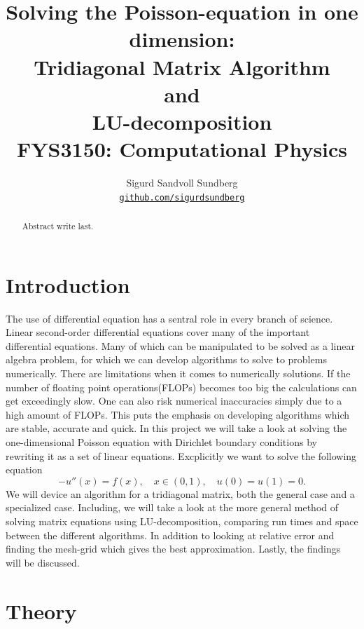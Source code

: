 \documentclass[10pt, a4paper]{amsart}
\title[Solving the Poisson-equation in one dimension]{Solving the Poisson-equation in one dimension: \\
\normalsize{Tridiagonal Matrix Algorithm\\
 and \\
 LU-decomposition} \\
  \hrulefill\small{ FYS3150: Computational Physics }\hrulefill}
\author[Sundberg]{Sigurd Sandvoll Sundberg \\
  \href{https://github.com/SigurdSundberg/FYS3150/tree/master/project1}{\texttt{github.com/sigurdsundberg}}}
\begin{document}
\begin{titlepage}
\begin{abstract}
Abstract write last.
\end{abstract}
\maketitle
\tableofcontents
\end{titlepage}

\section{Introduction}
The use of differential equation has a sentral role in every branch of science. Linear second-order differential equations cover many of the important differential equations. Many of which can be manipulated to be solved as a linear algebra problem, for which we can develop algorithms to solve to problems numerically. There are limitations when it comes to numerically solutions. If the number of floating point operations(FLOPs) becomes too big the calculations can get exceedingly slow. One can also risk numerical inaccuracies simply due to a high amount of FLOPs. This puts the emphasis on developing algorithms which are stable, accurate and quick. 
In this project we will take a look at solving the one-dimensional Poisson equation with Dirichlet boundary conditions by rewriting it as a set of linear equations. Excplicitly we want to solve the following equation
\begin{equation}
-u''(x) = f(x), \quad x\in(0,1), \quad u(0)=u(1)=0.\label{eq:base}
\end{equation}
We will device an algorithm for a tridiagonal matrix, both the general case and a specialized case. Including, we will take a look at the more general method of solving matrix equations using LU-decomposition, comparing run times and space between the different algorithms. In addition to looking at relative error and finding the mesh-grid which gives the best approximation. Lastly, the findings will be discussed. 


\section{Theory}
\end{document}
